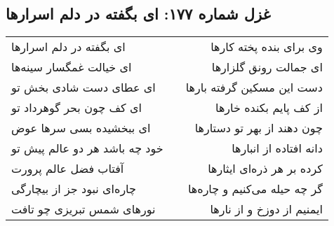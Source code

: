 \begin{center}
\section*{غزل شماره ۱۷۷: ای بگفته در دلم اسرارها}
\label{sec:0177}
\begin{longtable}{l p{0.5cm} r}
ای بگفته در دلم اسرارها
&&
وی برای بنده پخته کارها
\\
ای خیالت غمگسار سینه‌ها
&&
ای جمالت رونق گلزارها
\\
ای عطای دست شادی بخش تو
&&
دست این مسکین گرفته بارها
\\
ای کف چون بحر گوهرداد تو
&&
از کف پایم بکنده خارها
\\
ای ببخشیده بسی سرها عوض
&&
چون دهند از بهر تو دستارها
\\
خود چه باشد هر دو عالم پیش تو
&&
دانه افتاده از انبارها
\\
آفتاب فضل عالم پرورت
&&
کرده بر هر ذره‌ای ایثارها
\\
چاره‌ای نبود جز از بیچارگی
&&
گر چه حیله می‌کنیم و چاره‌ها
\\
نورهای شمس تبریزی چو تافت
&&
ایمنیم از دوزخ و از نارها
\\
\end{longtable}
\end{center}

